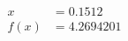 \documentclass[preview]{standalone}
\begin{document}
\begin{align*}
x &= 0.1512\\f(x) &= 4.2694201
\end{align*}
\end{document}

